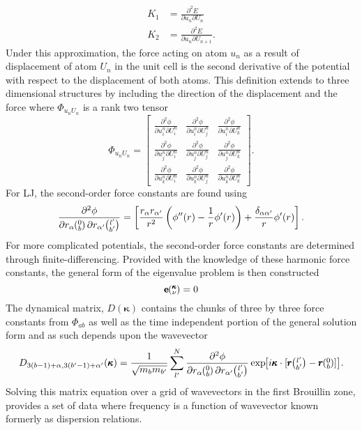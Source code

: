 %
\begin{equation}
\begin{split}
	K_1&=\frac{\partial^2 E}{\partial u_n\partial U_{n}}\\
	K_2&=\frac{\partial^2 E}{\partial u_n\partial U_{n+1}}.
\end{split}
\end{equation}
%
Under this approximation, the force acting on atom $u_n$ as a result of displacement of atom $U_n$ in the unit cell is the second derivative of the potential with respect to the displacement of both atoms. This definition extends to three dimensional structures by including the direction of the displacement and the force where $\Phi_{u_nU_n}$ is a rank two tensor
%
\begin{equation}
\Phi_{u_nU_n}=
\begin{bmatrix}
  \frac{\partial^2 \phi}{\partial u^n_i\partial U^n_i} & \frac{\partial^2 \phi}{\partial u^n_i\partial U^n_j} &\frac{\partial^2 \phi}{\partial u^n_i\partial U^n_k}\\
  \frac{\partial^2 \phi}{\partial u^n_j\partial U^n_i} & \frac{\partial^2 \phi}{\partial u^n_j\partial U^n_j} &\frac{\partial^2 \phi}{\partial u^n_j\partial U^n_k}\\
\frac{\partial^2 \phi}{\partial u^n_k\partial U^n_i} & \frac{\partial^2 \phi}{\partial u^n_k\partial U^n_j} &\frac{\partial^2 \phi}{\partial u^n_k\partial U^n_k}
 \end{bmatrix}.
\end{equation}
For LJ, the second-order force constants are found using
\begin{equation}
\frac{\partial^2\phi}{\partial r_\alpha \mspace{-4.0mu}\left(\mspace{-8.0mu} \begin{smallmatrix}&0 \\&b\end{smallmatrix}\mspace{-3.0mu}\right) \partial r_{\alpha'} \mspace{-4.0mu}\left(\mspace{-8.0mu} \begin{smallmatrix}&l' \\&b'\end{smallmatrix}\mspace{-3.0mu}\right)}=\left[\frac{r_{\alpha}r_{\alpha'}}{r^2}\left(\phi''(r)-\frac{1}{r}\phi'(r)\right)+\frac{\delta_{\alpha\alpha'}}{r}\phi'(r)\right].
\end{equation}
For more complicated potentials, the second-order force constants are determined through finite-differencing. Provided with the knowledge of these harmonic force constants, the general form of the eigenvalue problem is then constructed \cite{dove_introduction_1993-3}
\begin{equation}
[D(\pmb{\kappa})-I\omega^2\kv]\pmb{\mathrm{e}}\kv = 0
\end{equation}
%
The dynamical matrix, $D(\pmb{\kappa})$ contains the chunks of three by three force constants from $\Phi_{ab}$ as well as the time independent portion of the general solution form and as such depends upon the wavevector
\begin{equation}
D_{3(b-1)+\alpha,3(b'-1)+\alpha'}(\pmb{\kappa})=\frac{1}{\sqrt{m_bm_{b'}}}\sum_{l'}^N\frac{\partial^2\phi}{\partial r_\alpha \Ob \partial r_{\alpha'} \lbp} \EXP{i\pmb{\kappa}\cdot [\pmb{r}\lbp-\pmb{r}\Ob]}.
\end{equation}
Solving this matrix equation over a grid of wavevectors in the first Brouillin zone, provides a set of data where frequency is a function of wavevector known formerly as dispersion relations.%

